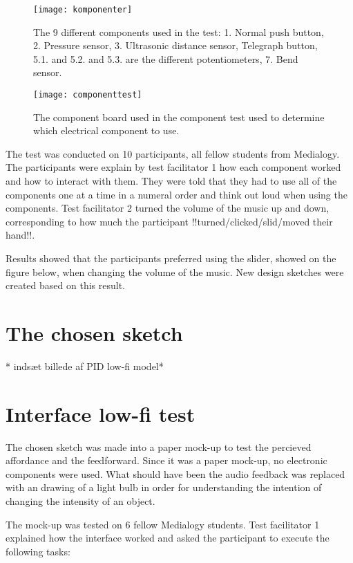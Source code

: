 \begin{figure}[!h] 
\centering
\texttt{[image: komponenter]}
\caption{\label{fig:komponenter} The 9 different components used in the test: 1. Normal push button, 2. Pressure sensor, 3. Ultrasonic distance sensor, Telegraph button, 5.1. and 5.2. and 5.3. are the different potentiometers, 7. Bend sensor.}
\end{figure}

\begin{figure}[!h] 
\centering
\texttt{[image: componenttest]}
\caption{\label{fig:componenttest} The component board used in the component test used to determine which electrical component to use.}
\end{figure}

The test was conducted on 10 participants, all fellow students from Medialogy. The participants were explain by test facilitator 1 how each component worked and how to interact with them. They were told that they had to use all of the components one at a time in a numeral order and think out loud when using the components. Test facilitator 2 turned the volume of the music up and down, corresponding to how much the participant !!turned/clicked/slid/moved their hand!!.

Results showed that the participants preferred using the slider, showed on the figure below, when changing the volume of the music. New design sketches were created based on this result.

\section{The chosen sketch}
* indsæt billede af PID low-fi model* 

\section{Interface low-fi test}
The chosen sketch was made into a paper mock-up to test the  percieved affordance and the  feedforward. Since it was a paper mock-up, no electronic components were used. What should have been the audio feedback was replaced with an drawing of a light bulb in order for understanding the intention of changing the intensity of an object. 

The mock-up was tested on 6 fellow Medialogy students. Test facilitator 1 explained how the interface worked and asked the participant to execute the following tasks:

